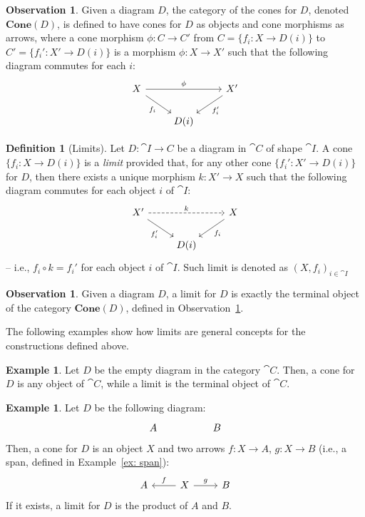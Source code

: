 \documentclass[a4paper, twoside,openright]{report}
\theoremstyle{plain}
\theoremstyle{definition}
\newtheorem{definition}[theorem]{Definition}
\newtheorem{example}[theorem]{Example}
\newtheorem{obs}[theorem]{Observation}
\begin{document}
\begin{obs}\label{obs:category_of_cones}
    Given a diagram $D$, the category of the cones for $D$, denoted $\textbf{Cone}(D)$, is defined to have cones for $D$ as objects and cone morphisms as arrows, where a cone morphism $\phi: C \rightarrow C'$ from $C = \{f_i: X \rightarrow D(i)\}$ to $C' = \{f_i':X' \rightarrow D(i)\}$ is a morphism $\phi: X \rightarrow X'$ such that the following diagram commutes for each $i$:
    \[
        \begin{tikzcd}
            X \arrow[rr, "{\phi}"] \arrow[dr, "{f_i}" swap] & & X' \arrow[dl, "{f_i'}"] \\
            & D(i) &
        \end{tikzcd}
    \]
\end{obs}

\begin{definition}[Limits]\label{def:limit}
    Let $D:\cat {I \rightarrow C}$ be a diagram in $\cat C$ of shape $\cat I$. A cone $\{f_i: X \rightarrow D(i)\}$ is a \emph{limit} provided that, for any other cone $\{f_{i}': X' \rightarrow D(i)\}$ for $D$, then there exists a unique morphism $k: X' \rightarrow X$ such that the following diagram commutes for each object $i$ of $\cat I$:
    \[
        \begin{tikzcd}
            X' \arrow[rr, dashed, "k"] \arrow[dr, "{f_i'}" swap] & & X \arrow[dl, "{f_i}"] \\
            & D(i) &
        \end{tikzcd}
    \]
    -- i.e., $f_i \circ k = f_i'$ for each object $i$ of $\cat I$. Such limit is denoted as $(X, f_i)_{i \in \cat I}$
\end{definition}

\begin{obs}
    Given a diagram $D$, a limit for $D$ is exactly the terminal object of the category $\textbf{Cone}(D)$, defined in Observation~\ref{obs:category_of_cones}.
\end{obs}

The following examples show how limits are general concepts for the constructions defined above.

\begin{example}
    Let $D$ be the empty diagram in the category $\cat C$. Then, a cone for $D$ is any object of $\cat C$, while a limit is the terminal object of $\cat C$.
\end{example}

\begin{example}\label{ex:product_are_limits}
    Let $D$ be the following diagram:
    \[
        \begin{tikzcd}
            A & & B
        \end{tikzcd}
    \]
    Then, a cone for $D$ is an object $X$ and two arrows $f: X \rightarrow A$, $g: X \rightarrow B$ (i.e., a span, defined in Example~\ref{ex: span}):
    \[
        \begin{tikzcd}
            A & X \arrow[l, "f" swap] \arrow[r, "g"] & B
        \end{tikzcd}
    \]
    If it exists, a limit for $D$ is the product of $A$ and $B$.
\end{example}
\end{document}
